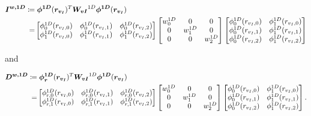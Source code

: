 \documentclass[12pt,Bold,letterpaper,TexShade]{mcgilletdclass}
\numberwithin{equation}{section}
\newcommand{\mat}[1]{\bm{{#1}}}
\newcommand{\vect}[1]{\bm{{#1}}}
\begin{document}
\begin{align*}
\mat{I^{w,1D}}
\coloneqq & \hspace{1mm}
\vect{\phi^{1D}}(\vect{r_{v_I}})^T \mat{W_{vI}}^{1D} \vect{\phi^{1D}}(\vect{r_{v_I}}) \\
= &
\begin{bmatrix}
\phi^{1D}_0(r_{v_I,0}) & \phi^{1D}_0(r_{v_I,1}) & \phi^{1D}_0(r_{v_I,2}) \\
\phi^{1D}_1(r_{v_I,0}) & \phi^{1D}_1(r_{v_I,1}) & \phi^{1D}_1(r_{v_I,2}) \\
\end{bmatrix}
\begin{bmatrix}
w^{1D}_0 & 0 & 0 \\
0 & w^{1D}_1 & 0 \\
0 & 0 & w^{1D}_2 \\
\end{bmatrix}
\begin{bmatrix}
\phi^{1D}_0(r_{v_I,0}) & \phi^{1D}_1(r_{v_I,0}) \\
\phi^{1D}_0(r_{v_I,1}) & \phi^{1D}_1(r_{v_I,1}) \\
\phi^{1D}_0(r_{v_I,2}) & \phi^{1D}_1(r_{v_I,2}) \\
\end{bmatrix}
\end{align*}

and

\begin{align*}
\mat{D^{w,1D}}
\coloneqq & \hspace{1mm}
\vect{\phi^{1D}_r}(\vect{r_{v_I}})^T \mat{W_{vI}}^{1D} \vect{\phi^{1D}}(\vect{r_{v_I}}) \\
= &
\begin{bmatrix}
\phi^{1D}_{r,0}(r_{v_I,0}) & \phi^{1D}_{r,0}(r_{v_I,1}) & \phi^{1D}_{r,0}(r_{v_I,2}) \\
\phi^{1D}_{r,1}(r_{v_I,0}) & \phi^{1D}_{r,1}(r_{v_I,1}) & \phi^{1D}_{r,1}(r_{v_I,2}) \\
\end{bmatrix}
\begin{bmatrix}
w^{1D}_0 & 0 & 0 \\
0 & w^{1D}_1 & 0 \\
0 & 0 & w^{1D}_2 \\
\end{bmatrix}
\begin{bmatrix}
\phi^{1D}_0(r_{v_I,0}) & \phi^{1D}_1(r_{v_I,0}) \\
\phi^{1D}_0(r_{v_I,1}) & \phi^{1D}_1(r_{v_I,1}) \\
\phi^{1D}_0(r_{v_I,2}) & \phi^{1D}_1(r_{v_I,2}) \\
\end{bmatrix}.
\end{align*}
\end{document}
